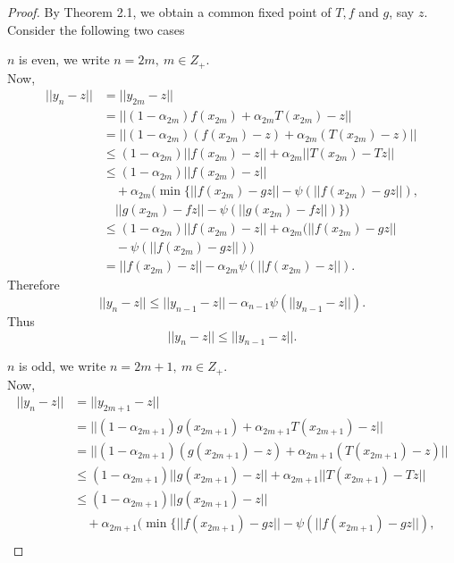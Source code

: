 \documentclass[11]{article}
\numberwithin{equation}{definition}
\begin{document}
\begin{proof}
By Theorem 2.1, we obtain a common fixed point of $T,f$ and $g$, say $z$.\\
Consider the following two cases\\
\item[Case (i):] $n$ is even, we write $n=2m,\ m\in Z_{+}$.\\
Now,
\begin{align*}
||y_{n}-z|| &= ||y_{2m}-z|| \\
&= ||(1-\alpha_{2m})f(x_{2m})+\alpha_{2m}T(x_{2m})-z|| \\
&= ||(1-\alpha_{2m})(f(x_{2m})-z)+\alpha_{2m}(T(x_{2m})-z)|| \\
&\leq (1-\alpha_{2m})||f(x_{2m})-z||+\alpha_{2m}||T(x_{2m})-Tz|| \\
&\leq (1-\alpha_{2m})||f(x_{2m})-z|| \\
&\quad +\alpha_{2m}(\min\{||f(x_{2m})-gz||-\psi(||f(x_{2m})-gz||), \\
&\quad ||g(x_{2m})-fz||-\psi(||g(x_{2m})-fz||)\}) \\
&\leq (1-\alpha_{2m})||f(x_{2m})-z||+\alpha_{2m}(||f(x_{2m})-gz|| \\
&\quad -\psi(||f(x_{2m})-gz||)) \\
&= ||f(x_{2m})-z||-\alpha_{2m}\psi(||f(x_{2m})-z||).
\end{align*}
Therefore
\begin{equation}
||y_{n}-z||\leq||y_{n-1}-z||-\alpha_{n-1}\psi(||y_{n-1}-z||).
\end{equation}
Thus
\begin{equation}
||y_{n}-z||\leq||y_{n-1}-z||.
\end{equation}
\item[Case (ii):] $n$ is odd, we write $n=2m+1,\ m\in Z_{+}$.\\
Now,
\begin{align}
||y_{n}-z|| &= ||y_{2m+1}-z|| \nonumber\\
&= ||(1-\alpha_{2m+1})g(x_{2m+1})+\alpha_{2m+1}T(x_{2m+1})-z|| \nonumber \\
&= ||(1-\alpha_{2m+1})(g(x_{2m+1})-z)+\alpha_{2m+1}(T(x_{2m+1})-z)|| \nonumber \\
&\leq (1-\alpha_{2m+1})||g(x_{2m+1})-z||+\alpha_{2m+1}||T(x_{2m+1})-Tz|| \nonumber \\
&\leq (1-\alpha_{2m+1})||g(x_{2m+1})-z|| \nonumber \\
&\quad +\alpha_{2m+1}(\min\{||f(x_{2m+1})-gz||-\psi(||f(x_{2m+1})-gz||), \nonumber \\

\end{align}
\end{proof}
\end{document}
